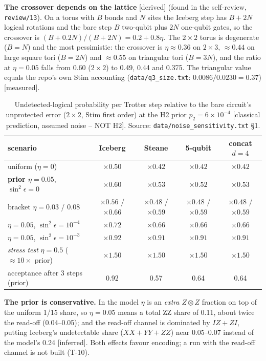 \documentclass[11pt,a4paper]{article}
\newcommand{\tg}[1]{\textsf{\small[#1]}}
\newcommand{\der}{\tg{derived}}
\newcommand{\mea}{\tg{measured}}
\newcommand{\infr}{\tg{inferred}}
\newcommand{\cp}{\tg{classical prediction, assumed noise -- NOT H2}}
\newcommand{\code}[1]{\nolinkurl{#1}}
\begin{document}
\textbf{The crossover depends on the lattice} \der{} (found in the self-review, \code{review/13}). On a torus with
$B$ bonds and $N$ sites the Iceberg step has $B+2N$ logical rotations and the bare step $B$ two-qubit plus $2N$
one-qubit gates, so the crossover is $(B+0.2N)/(B+2N)=0.2+0.8\eta$. The $2\times2$ torus is degenerate ($B=N$) and the
most pessimistic: the crossover is $\eta\approx0.36$ on $2\times3$, $\approx0.44$ on large square tori ($B=2N$) and
$\approx0.55$ on triangular tori ($B=3N$), and the ratio at $\eta=0.05$ falls from 0.60 ($2\times2$) to 0.49, 0.44 and
0.375. The triangular value equals the repo's own Stim accounting (\code{data/q3_size.txt}: $0.0086/0.0230=0.37$) \mea.

\begin{table}[h]\centering\small
\caption{Undetected-logical probability per Trotter step relative to the bare circuit's unprotected error
($2\times2$, Stim first order) at the H2 prior $p_2=6\times10^{-4}$ \cp. Source: \code{data/noise_sensitivity.txt} \S1.}
\label{tab:prior}
\begin{tabular}{lcccc}
\toprule
scenario & Iceberg & Steane & 5-qubit & concat $d=4$\\
\midrule
uniform ($\eta=0$) & $\times0.50$ & $\times0.42$ & $\times0.42$ & $\times0.42$\\
\textbf{prior $\eta=0.05$}, $\sin^2\epsilon=0$ & $\mathbf{\times0.60}$ & $\times0.53$ & $\times0.52$ & $\times0.53$\\
bracket $\eta=0.03$ / $0.08$ & $\times0.56$ / $\times0.66$ & $\times0.48$ / $\times0.59$ & $\times0.48$ / $\times0.59$ & $\times0.48$ / $\times0.59$\\
$\eta=0.05$, $\sin^2\epsilon=10^{-4}$ & $\times0.72$ & $\times0.66$ & $\times0.66$ & $\times0.66$\\
$\eta=0.05$, $\sin^2\epsilon=10^{-3}$ & $\times0.92$ & $\times0.91$ & $\times0.91$ & $\times0.91$\\
\emph{stress test} $\eta=0.5$ (${\approx}10\times$ prior) & $\times1.50$ & $\times1.50$ & $\times1.50$ & $\times1.50$\\
\midrule
acceptance after 3 steps (prior) & 0.92 & 0.57 & 0.64 & 0.64\\
\bottomrule
\end{tabular}
\end{table}

\textbf{The prior is conservative.} In the model $\eta$ is an \emph{extra} $Z\otimes Z$ fraction on top of the
uniform 1/15 share, so $\eta=0.05$ means a total ZZ share of 0.11, about twice the read-off (0.04--0.05); and the
read-off channel is dominated by $IZ{+}ZI$, putting Iceberg's undetectable share ($XX{+}YY{+}ZZ$) near 0.05--0.07
instead of the model's 0.24 \infr. Both effects favour encoding; a run with the read-off channel is not built (T-10).
\end{document}
